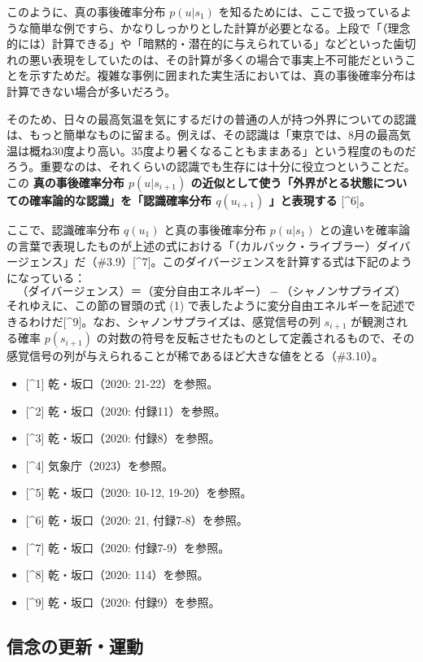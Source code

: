 このように、真の事後確率分布 \(p(u|s_1)\)
を知るためには、ここで扱っているような簡単な例ですら、かなりしっかりとした計算が必要となる。上段で「（理念的には）計算できる」や「暗黙的・潜在的に与えられている」などといった歯切れの悪い表現をしていたのは、その計算が多くの場合で事実上不可能だということを示すためだ。複雑な事例に囲まれた実生活においては、真の事後確率分布は計算できない場合が多いだろう。

そのため、日々の最高気温を気にするだけの普通の人が持つ外界についての認識は、もっと簡単なものに留まる。例えば、その認識は「東京では、8月の最高気温は概ね30度より高い。35度より暑くなることもままある」という程度のものだろう。重要なのは、それくらいの認識でも生存には十分に役立つということだ。この
\textbf{真の事後確率分布 \(p(u|s_{i+1})\)
の近似として使う「外界がとる状態についての確率論的な認識」を「認識確率分布
\(q(u_{i+1})\) 」と表現する} {[}\^{}6{]}。

ここで、認識確率分布 \(q(u_1)\) と真の事後確率分布 \(p(u|s_1)\)
との違いを確率論の言葉で表現したものが上述の式における「（カルバック・ライブラー）ダイバージェンス」だ（\#3.9）{[}\^{}7{]}。このダイバージェンスを計算する式は下記のようになっている：
\[
（ダイバージェンス）＝（変分自由エネルギー）-（シャノンサプライズ）\tag{2}
\] それゆえに、この節の冒頭の式 (1)
で表したように変分自由エネルギーを記述できるわけだ{[}\^{}9{]}。なお、シャノンサプライズは、感覚信号の列
\(s_{i+1}\) が観測される確率 \(p(s_{i+1})\)
の対数の符号を反転させたものとして定義されるもので、その感覚信号の列が与えられることが稀であるほど大きな値をとる（\#3.10）。

\begin{itemize}
\tightlist
\item
  {[}\^{}1{]} 乾・坂口（2020: 21-22）を参照。
\item
  {[}\^{}2{]} 乾・坂口（2020: 付録11）を参照。
\item
  {[}\^{}3{]} 乾・坂口（2020: 付録8）を参照。
\item
  {[}\^{}4{]} 気象庁（2023）を参照。
\item
  {[}\^{}5{]} 乾・坂口（2020: 10-12, 19-20）を参照。
\item
  {[}\^{}6{]} 乾・坂口（2020: 21, 付録7-8）を参照。
\item
  {[}\^{}7{]} 乾・坂口（2020: 付録7-9）を参照。
\item
  {[}\^{}8{]} 乾・坂口（2020: 114）を参照。
\item
  {[}\^{}9{]} 乾・坂口（2020: 付録9）を参照。
\end{itemize}

\subsection{信念の更新・運動}\label{ux4fe1ux5ff5ux306eux66f4ux65b0ux904bux52d5}

